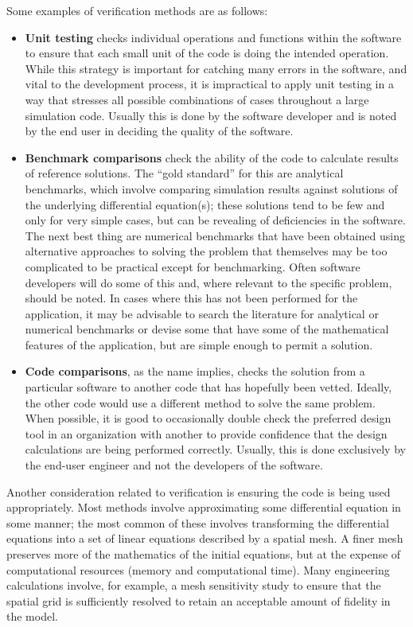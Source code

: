 Some examples of verification methods are as follows:
\begin{itemize}
  \item {\bf Unit testing} checks individual operations and functions within the software to ensure that each small unit of the code is doing the intended operation. While this strategy is important for catching many errors in the software, and vital to the development process, it is impractical to apply unit testing in a way that stresses all possible combinations of cases throughout a large simulation code. Usually this is done by the software developer and is noted by the end user in deciding the quality of the software.
  \item {\bf Benchmark comparisons} check the ability of the code to calculate results of reference solutions. The ``gold standard'' for this are analytical benchmarks, which involve comparing simulation results against solutions of the underlying differential equation(s); these solutions tend to be few and only for very simple cases, but can be revealing of deficiencies in the software. The next best thing are numerical benchmarks that have been obtained using alternative approaches to solving the problem that themselves may be too complicated to be practical except for benchmarking. Often software developers will do some of this and, where relevant to the specific problem, should be noted. In cases where this has not been performed for the application, it may be advisable to search the literature for analytical or numerical benchmarks or devise some that have some of the mathematical features of the application, but are simple enough to permit a solution.
  \item {\bf Code comparisons}, as the name implies, checks the solution from a particular software to another code that has hopefully been vetted. Ideally, the other code would use a different method to solve the same problem. When possible, it is good to occasionally double check the preferred design tool in an organization with another to provide confidence that the design calculations are being performed correctly. Usually, this is done exclusively by the end-user engineer and not the developers of the software.
\end{itemize}

Another consideration related to verification is ensuring the code is being used appropriately. Most methods involve approximating some differential equation in some manner; the most common of these involves transforming the differential equations into a set of linear equations described by a spatial mesh. A finer mesh preserves more of the mathematics of the initial equations, but at the expense of computational resources (memory and computational time). Many engineering calculations involve, for example, a mesh sensitivity study to ensure that the spatial grid is sufficiently resolved to retain an acceptable amount of fidelity in the model.

